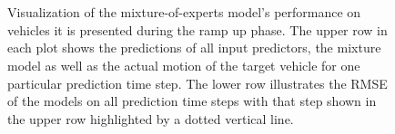 \begin{figure}[t!]
    \centering
    \\
    \\
    \caption{Visualization of the mixture-of-experts model's performance on vehicles it is presented during the ramp up phase.
    The upper row in each plot shows the predictions of all input predictors, the mixture model as well as the actual motion of the target vehicle for one particular prediction time step.
The lower row illustrates the \ac{RMSE} of the models on all prediction time steps with that step shown in the upper row highlighted by a dotted vertical line.}
\label{fig:mix_train_obj}
\end{figure}

